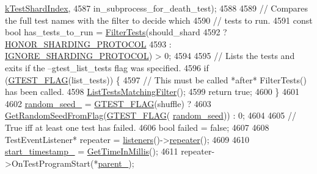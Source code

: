 \begin{DoxyCode}
{      \hyperlink{namespacetesting_a5f76dfdb8cb2664da54e320ecaba3643}{kTestShardIndex},
4587                                         in\_subprocess\_for\_death\_test);
4588 
4589   \textcolor{comment}{// Compares the full test names with the filter to decide which}
4590   \textcolor{comment}{// tests to run.}
4591   \textcolor{keyword}{const} \textcolor{keywordtype}{bool} has\_tests\_to\_run = \hyperlink{classtesting_1_1internal_1_1UnitTestImpl_abd47e447f0c2557ed528db0350671bed}{FilterTests}(should\_shard
4592                                               ? \hyperlink{classtesting_1_1internal_1_1UnitTestImpl_acc5ffd3f9bc2e87bb3dba4218f58af43abec11f1c4bb8a3e2b99fa8328bccd58c}{HONOR\_SHARDING\_PROTOCOL}
4593                                               : \hyperlink{classtesting_1_1internal_1_1UnitTestImpl_acc5ffd3f9bc2e87bb3dba4218f58af43a68bd0b7e6a7bead14c93d1a42144095a}{IGNORE\_SHARDING\_PROTOCOL}) > 0;
4594 
4595   \textcolor{comment}{// Lists the tests and exits if the --gtest\_list\_tests flag was specified.}
4596   \textcolor{keywordflow}{if} (\hyperlink{gtest-port_8h_a828f4e34a1c4b510da50ec1563e3562a}{GTEST\_FLAG}(list\_tests)) \{
4597     \textcolor{comment}{// This must be called *after* FilterTests() has been called.}
4598     \hyperlink{classtesting_1_1internal_1_1UnitTestImpl_ad2cfedef41d3d29aad23c2c64214e6f3}{ListTestsMatchingFilter}();
4599     \textcolor{keywordflow}{return} \textcolor{keyword}{true};
4600   \}
4601 
4602   \hyperlink{classtesting_1_1internal_1_1UnitTestImpl_a0afcc95308ebfacb8d0f53790e77e1ab}{random\_seed\_} = \hyperlink{gtest-port_8h_a828f4e34a1c4b510da50ec1563e3562a}{GTEST\_FLAG}(shuffle) ?
4603       \hyperlink{namespacetesting_1_1internal_ae74fedbdaebaac8d1202192266243b9e}{GetRandomSeedFromFlag}(\hyperlink{gtest-port_8h_a828f4e34a1c4b510da50ec1563e3562a}{GTEST\_FLAG}(
      \hyperlink{classtesting_1_1internal_1_1UnitTestImpl_a625b9fb6d17b008c44fc902255e6343c}{random\_seed})) : 0;
4604 
4605   \textcolor{comment}{// True iff at least one test has failed.}
4606   \textcolor{keywordtype}{bool} failed = \textcolor{keyword}{false};
4607 
4608   TestEventListener* repeater = \hyperlink{classtesting_1_1internal_1_1UnitTestImpl_a67211f8475936f88d0e4d30f841c0da4}{listeners}()->\hyperlink{classtesting_1_1TestEventListeners_ad28af964081553de465fbfc1c5a46650}{repeater}();
4609 
4610   \hyperlink{classtesting_1_1internal_1_1UnitTestImpl_a2114799ed634ee849b9dcd9728f9b7b6}{start\_timestamp\_} = \hyperlink{namespacetesting_1_1internal_ae66b46943a429e6efb1db456d4cae90c}{GetTimeInMillis}();
4611   repeater->OnTestProgramStart(*\hyperlink{classtesting_1_1internal_1_1UnitTestImpl_adabbbc8985202ce655d50746bd383eae}{parent\_});
}
\end{DoxyCode}
